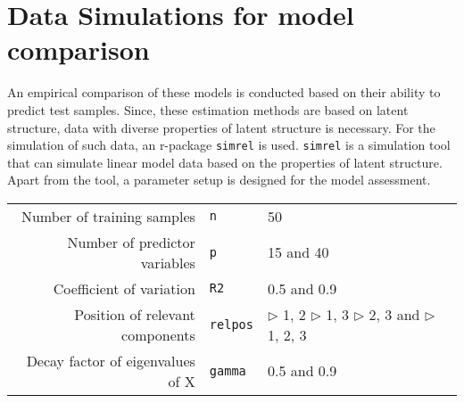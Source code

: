 \documentclass[a4paper, 11pt]{article}
\begin{document}
\section{Data Simulations for model comparison}
\label{sec:data-simulation}

An empirical comparison of these models is conducted based on their ability to
predict test samples. Since, these estimation methods are based on latent
structure, data with diverse properties of latent structure is necessary. For
the simulation of such data, an r-package {\tt simrel} is used. {\tt simrel} is
a simulation tool that can simulate linear model data based on the properties of
latent structure. Apart from the tool, a parameter setup is designed for the
model assessment.

\bigskip

\begin{tabular}{rll}
  Number of training samples       & {\tt n}     & 50 \\
  Number of predictor variables    & {\tt p}     & 15 and 40 \\
  Coefficient of variation         & {\tt R2}    & 0.5 and 0.9 \\
  Position of relevant components  & {\tt relpos}
                                   & $\triangleright$ 1, 2 \;           
                                    $\triangleright$ 1,  3 \; \newline  
                                    $\triangleright$ 2,  3 and \;       
                                    $\triangleright$ 1,  2, 3 \\        
  Decay factor of eigenvalues of X & {\tt gamma} & 0.5 and 0.9
\end{tabular}

\bigskip
\end{document}
